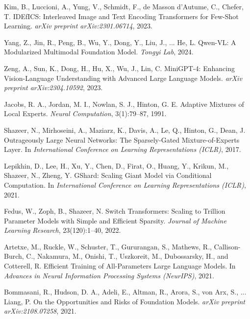 \documentclass[conference]{IEEEtran}
\begin{document}
\begin{thebibliography}{999}
Kim, B., Luccioni, A., Yung, V., Schmidt, F., de Masson d'Autume, C., Chefer, T.
\newblock IDEfICS: Interleaved Image and Text Encoding Transformers for Few-Shot Learning.
\newblock \emph{arXiv preprint arXiv:2301.06714}, 2023.

Yang, Z., Jin, R., Peng, B., Wu, Y., Dong, Y., Liu, J., ... He, L.
\newblock Qwen-VL: A Modularized Multimodal Foundation Model.
\newblock \emph{Tongyi Lab}, 2024.

Zeng, A., Sun, K., Dong, H., Hu, X., Wu, J., Lin, C.
\newblock MiniGPT-4: Enhancing Vision-Language Understanding with Advanced Large Language Models.
\newblock \emph{arXiv preprint arXiv:2304.10592}, 2023.

Jacobs, R. A., Jordan, M. I., Nowlan, S. J., Hinton, G. E.
\newblock Adaptive Mixtures of Local Experts.
\newblock \emph{Neural Computation}, 3(1):79–87, 1991.

Shazeer, N., Mirhoseini, A., Maziarz, K., Davis, A., Le, Q., Hinton, G., Dean, J.
\newblock Outrageously Large Neural Networks: The Sparsely-Gated Mixture-of-Experts Layer.
\newblock In \emph{International Conference on Learning Representations (ICLR)}, 2017.

Lepikhin, D., Lee, H., Xu, Y., Chen, D., Firat, O., Huang, Y., Krikun, M., Shazeer, N., Zheng, Y.
\newblock GShard: Scaling Giant Model via Conditional Computation.
\newblock In \emph{International Conference on Learning Representations (ICLR)}, 2021.

Fedus, W., Zoph, B., Shazeer, N.
\newblock Switch Transformers: Scaling to Trillion Parameter Models with Simple and Efficient Sparsity.
\newblock \emph{Journal of Machine Learning Research}, 23(120):1–40, 2022.

Artetxe, M., Ruckle, W., Schuster, T., Gururangan, S., Mathews, R., Callison-Burch, C., Nakamura, M., Onishi, T., Uszkoreit, M., Dubossarsky, H., and Cotterell, R.
\newblock Efficient Training of All-Parameters Large Language Models.
\newblock In \emph{Advances in Neural Information Processing Systems (NeurIPS)}, 2021.

Bommasani, R., Hudson, D. A., Adeli, E., Altman, R., Arora, S., von Arx, S., ... Liang, P.
\newblock On the Opportunities and Risks of Foundation Models.
\newblock \emph{arXiv preprint arXiv:2108.07258}, 2021.


\end{thebibliography}
\end{document}
